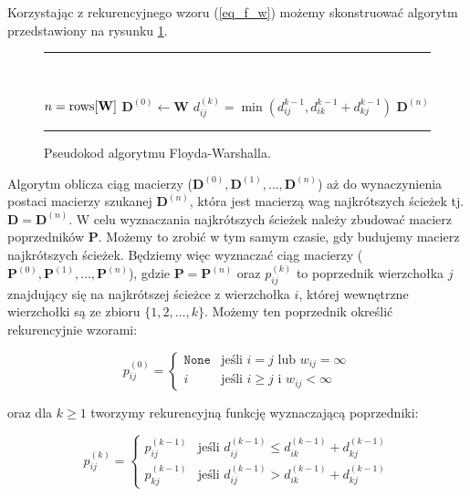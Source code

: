 \documentclass[12pt,a4paper]{book}
\newenvironment{myalgorithm}
{\rule{\textwidth}{0.5mm}\\\SetAlCapSty{}\SetAlgoNoEnd\SetAlgoNoLine\begin{algorithm}}{\end{algorithm}\rule{\textwidth}{0.5mm}}
\theoremstyle{definition}
\numberwithin{equation}{chapter}
\begin{document}
Korzystając z rekurencyjnego wzoru (\ref{eq_f_w}) możemy skonstruować algorytm przedstawiony na rysunku \ref{Floyd_Warshall}.

\begin{figure}[ht]
\begin{myalgorithm}[H]
	\DontPrintSemicolon
	{
		$n = \mbox{rows[\textbf{W}]}$\;
		$\mathbf{D}^{(0)} \leftarrow \mathbf{W}$\;
		{
			{
				{
					$d_{i j}^{(k)} = \min(d_{i j}^{k-1}, d_{i k}^{k-1} + d_{k j}^{k-1})$\;
				}
			}
		}
		\Return $\mathbf{D}^{(n)}$\;
	}
\end{myalgorithm}
\caption{Pseudokod algorytmu Floyda-Warshalla.}
\label{Floyd_Warshall}
\end{figure}

Algorytm oblicza ciąg macierzy ($\mathbf{D}^{(0)}, \mathbf{D}^{(1)}, \dots , \mathbf{D}^{(n)}$) aż do wynaczynienia postaci macierzy szukanej $\mathbf{D}^{(n)}$, która jest macierzą wag najkrótszych ścieżek tj. $\mathbf{D} = \mathbf{D}^{(n)}$. W celu wyznaczania najkrótszych ścieżek należy zbudować macierz poprzedników $\mathbf{P}$. Możemy to zrobić w tym samym czasie, gdy budujemy macierz najkrótszych ścieżek. Będziemy więc wyznaczać ciąg macierzy ($\mathbf{P}^{(0)}, \mathbf{P}^{(1)}, \dots , \mathbf{P}^{(n)}$), gdzie $\mathbf{P} = \mathbf{P}^{(n)}$ oraz $p_{ij}^{(k)}$ to poprzednik wierzchołka $j$ znajdujący się na najkrótszej ścieżce z wierzchołka $i$, której wewnętrzne wierzchołki są ze zbioru $\{1,2,\dots,k\}$. Możemy ten poprzednik określić rekurencyjnie wzorami:

\[
 p_{i j}^{(0)} = 
  \begin{cases} 
   \texttt{None} & \text{jeśli } i = j \text{ lub } w_{i j} = \infty \\
   i & \text{jeśli } i \geq j \text{ i } w_{i j} < \infty
  \end{cases}
\]

oraz dla $k \geq 1$ tworzymy rekurencyjną funkcję wyznaczającą poprzedniki:

\[
 p_{i j}^{(k)} = 
  \begin{cases} 
   p_{i j}^{(k-1)} & \text{jeśli } d_{i j}^{(k-1)} \leq d_{i k}^{(k-1)} + d_{k j}^{(k-1)} \\
   p_{k j}^{(k-1)} & \text{jeśli } d_{i j}^{(k-1)} > d_{i k}^{(k-1)} + d_{k j}^{(k-1)}
  \end{cases}
\]
\end{document}
